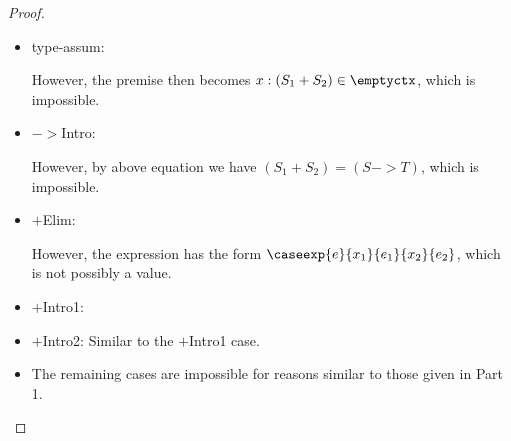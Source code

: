 \begin{proof}{}
  \begin{itemize}
  \item type-assum:
  
  \begin{llproof}
  \end{llproof}
  
  However, the premise then becomes $x : (S_1 + S_2) \in \emptyctx$, which is impossible.

  \item $->$Intro:
  
  \begin{llproof}
  \end{llproof}
  
  However, by above equation we have $(S_1 + S_2) = (S -> T)$, which is impossible.

  \item $+$Elim:
  
  \begin{llproof}
  \end{llproof}
  
  However, the expression has the form $\caseexp{e}{x_1}{e_1}{x_2}{e_2}$, which is not possibly a value.

  \item $+$Intro1:
  
  \begin{llproof}
  \end{llproof}

  \item $+$Intro2: Similar to the $+$Intro1 case.

  \item{} The remaining cases are impossible for reasons similar to those
    given in Part 1.
  \qedhere
  \end{itemize}


\end{proof}





